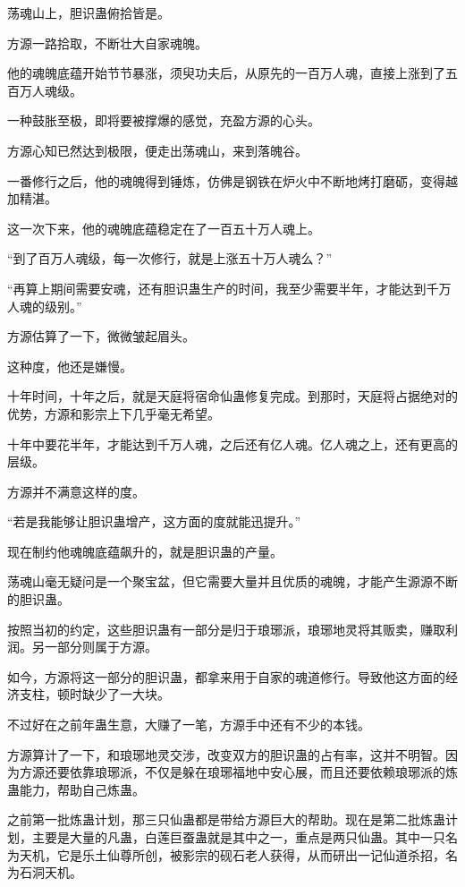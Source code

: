 
\begin{this_body}



荡魂山上，胆识蛊俯拾皆是。

方源一路拾取，不断壮大自家魂魄。

他的魂魄底蕴开始节节暴涨，须臾功夫后，从原先的一百万人魂，直接上涨到了五百万人魂级。

一种鼓胀至极，即将要被撑爆的感觉，充盈方源的心头。

方源心知已然达到极限，便走出荡魂山，来到落魄谷。

一番修行之后，他的魂魄得到锤炼，仿佛是钢铁在炉火中不断地烤打磨砺，变得越加精湛。

这一次下来，他的魂魄底蕴稳定在了一百五十万人魂上。

“到了百万人魂级，每一次修行，就是上涨五十万人魂么？”

“再算上期间需要安魂，还有胆识蛊生产的时间，我至少需要半年，才能达到千万人魂的级别。”

方源估算了一下，微微皱起眉头。

这种度，他还是嫌慢。

十年时间，十年之后，就是天庭将宿命仙蛊修复完成。到那时，天庭将占据绝对的优势，方源和影宗上下几乎毫无希望。

十年中要花半年，才能达到千万人魂，之后还有亿人魂。亿人魂之上，还有更高的层级。

方源并不满意这样的度。

“若是我能够让胆识蛊增产，这方面的度就能迅提升。”

现在制约他魂魄底蕴飙升的，就是胆识蛊的产量。

荡魂山毫无疑问是一个聚宝盆，但它需要大量并且优质的魂魄，才能产生源源不断的胆识蛊。

按照当初的约定，这些胆识蛊有一部分是归于琅琊派，琅琊地灵将其贩卖，赚取利润。另一部分则属于方源。

如今，方源将这一部分的胆识蛊，都拿来用于自家的魂道修行。导致他这方面的经济支柱，顿时缺少了一大块。

不过好在之前年蛊生意，大赚了一笔，方源手中还有不少的本钱。

方源算计了一下，和琅琊地灵交涉，改变双方的胆识蛊的占有率，这并不明智。因为方源还要依靠琅琊派，不仅是躲在琅琊福地中安心展，而且还要依赖琅琊派的炼蛊能力，帮助自己炼蛊。

之前第一批炼蛊计划，那三只仙蛊都是带给方源巨大的帮助。现在是第二批炼蛊计划，主要是大量的凡蛊，白莲巨蚕蛊就是其中之一，重点是两只仙蛊。其中一只名为天机，它是乐土仙尊所创，被影宗的砚石老人获得，从而研出一记仙道杀招，名为石洞天机。


\end{this_body}
